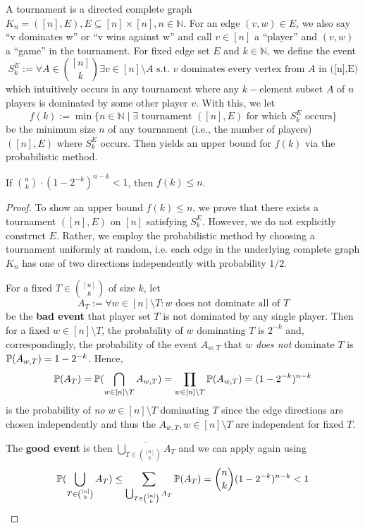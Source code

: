 \documentclass[../main.tex]{subfiles}
\begin{document}
\begin{example}[Tournaments]
	A tournament is a directed complete graph $K_n = ([n], E), E \subseteq [n] \times [n], n \in \mathbb{N}$. For an edge $(v,w) \in E$, we also say \enquote{v dominates w} or \enquote{v wins against w} and call $v \in [n]$ a \enquote{player} and $(v,w)$ a \enquote{game} in the tournament. For fixed edge set $E$ and $k \in \mathbb{N}$, we define the event
	$$S_k^{E} := \forall A \in \binom{[n]}{k} \exists v \in [n] \setminus A \text{ s.t. } v \text{ dominates every vertex from } A \text{ in ([n],E)}$$
	which intuitively occurs in any tournament where any $k-$element subset $A$ of $n$ players is dominated by some other player $v$. With this, we let
	$$f(k) := \min\{n \in \mathbb{N} \mid \exists \text{ tournament } ([n], E) \text{ for which } S_k^E \text{ occurs}\}$$
	be the minimum size $n$ of any tournament (i.e., the number of players) $([n], E)$ where $S_k^E$ occurs.
	Then  yields an upper bound for $f(k)$ via the probabilistic method.
\end{example}
		
\begin{proposition}\label{prop:tournamentProb}
	If $\binom{n}{k} \cdot (1-2^{-k})^{n-k} < 1$, then $f(k) \leq n$. 
\end{proposition}	
		
\begin{proof}
	To show an upper bound $f(k) \leq n$, we prove that there exists a tournament $([n], E)$ on $[n]$ satisfying $S_k^E$. However, we do not explicitly construct $E$. Rather, we employ the probabilistic method by choosing a tournament uniformly at random, i.e. each edge in the underlying complete graph $K_n$ has one of two directions independently with probability $1/2$. 
	
	For a fixed $T \in \binom{[n]}{k}$ of size $k$, let 
	$$A_T := \forall w \in [n]\setminus T: w \text{ does not dominate all of } T$$
	be the \textbf{bad event} that player set $T$ is not dominated by any single player. Then for a fixed $w \in [n]\setminus T$, the probability of $w$ dominating $T$ is $2^{-k}$ and, correspondingly, the probability of the event $A_{w,T}$ that $w$ \textit{does not} dominate $T$ is $\mathbb{P}(A_{w,T}) = 1-2^{-k}$. Hence, $$\mathbb{P}(A_T) = \mathbb{P}(\bigcap_{w \in [n] \setminus T} A_{w,T}) = \prod_{w \in [n] \setminus T} \mathbb{P}(A_{w,T}) = (1-2^{-k})^{n-k}$$ is the probability of \textit{no} $w \in [n]\setminus T$ dominating $T$ since the edge directions are chosen independently and thus the $A_{w,T}, w \in [n]\setminus T$ are independent for fixed $T$.
	
	The \textbf{good event} is then $\overline{\bigcup_{T \in \binom{[n]}{k}} A_T}$ and we can apply  again using $$\mathbb{P}(\bigcup_{T \in \binom{[n]}{k}} A_T) \leq \sum_{\bigcup_{T \in \binom{[n]}{k}} A_T} \mathbb{P}(A_T) = \binom{n}{k} (1-2^{-k})^{n-k} < 1$$
\end{proof}
\end{document}
